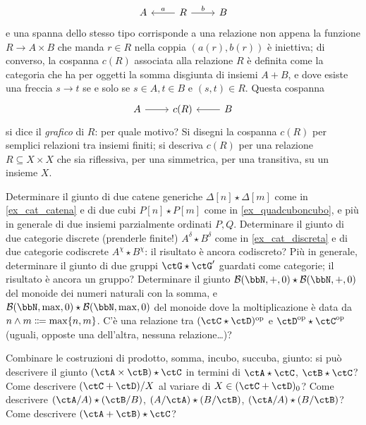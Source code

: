\begin{esercizi}
 \[
  \begin{tikzcd}
   A & R \ar[r, "b"]\ar[l, "a"']& B
  \end{tikzcd}
 \]
 e una spanna dello stesso tipo corrisponde a una relazione non appena la funzione \(R \to A\times B\) che manda \(r\in R\) nella coppia \((a(r),b(r))\) è iniettiva; di converso, la cospanna \(c(R)\) associata alla relazione \(R\) è definita come la categoria che ha per oggetti la somma disgiunta di insiemi \(A+B\), e dove esiste una freccia \(s\to t\) se e solo se \(s\in A,t\in B\) e \((s,t)\in R\). Questa cospanna
 \[
  \begin{tikzcd}
   A \ar[r] & c(R) & \ar[l] B
  \end{tikzcd}
 \]
 si dice il \emph{grafico} di \(R\): per quale motivo? Si disegni la cospanna \(c(R)\) per semplici relazioni tra insiemi finiti; si descriva \(c(R)\) per una relazione \(R\subseteq X\times X\) che sia riflessiva, per una simmetrica, per una transitiva, su un insieme \(X\).
 \item Determinare il giunto di due catene generiche \(\Delta[n] \star \Delta[m]\) come in \ref{ex_cat_catena} e di due cubi \(P[n] \star P[m]\) come in \ref{ex_quadcuboncubo}, e più in generale di due insiemi parzialmente ordinati \(P,Q\). Determinare il giunto di due categorie discrete (prenderle finite!) \(A^\delta \star B^\delta\) come in \ref{ex_cat_discreta} e di due categorie codiscrete \(A^\chi \star B^\chi\): il risultato è ancora codiscreto? Più in generale, determinare il giunto di due gruppi \(\ctG \star \ctG'\) guardati come categorie; il risultato è ancora un gruppo? Determinare il giunto \(\susp(\bbN,+,0) \star \susp(\bbN,+,0)\) del monoide dei numeri naturali con la somma, e \(\susp(\bbN,\max,0) \star \susp(\bbN,\max,0)\) del monoide dove la moltiplicazione è data da \(n\land m \defeq \max\{n,m\}\). C'è una relazione tra \((\ctC\star\ctD)^\op\) e \(\ctD^\op\star\ctC^\op\) (uguali, opposte una dell'altra, nessuna relazione\dots)?
 \item Combinare le costruzioni di prodotto, somma, incubo, succuba, giunto: si può descrivere il giunto \((\ctA\times\ctB)\star\ctC\) in termini di \(\ctA\star\ctC\), \(\ctB\star\ctC\)? Come descrivere \((\ctC+\ctD)/X\) al variare di \(X\in(\ctC+\ctD)_0\)? Come descrivere \((\ctA/A)\star(\ctB/B)\), \((A/\ctA)\star(B/\ctB)\), \((\ctA/A)\star(B/\ctB)\)? Come descrivere \((\ctA + \ctB)\star\ctC\)?
\end{esercizi}
